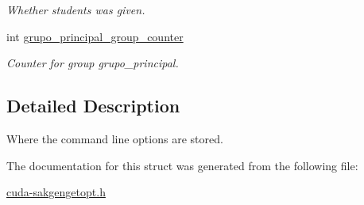 \begin{DoxyCompactItemize}
\begin{DoxyCompactList}\small\item\em Whether students was given. \end{DoxyCompactList}\item 
\hypertarget{structgengetopt__args__info_adea031a32e5ef772eaf83db95c152d3c}{int \hyperlink{structgengetopt__args__info_adea031a32e5ef772eaf83db95c152d3c}{grupo\-\_\-principal\-\_\-group\-\_\-counter}}\label{structgengetopt__args__info_adea031a32e5ef772eaf83db95c152d3c}

\begin{DoxyCompactList}\small\item\em Counter for group grupo\-\_\-principal. \end{DoxyCompactList}\end{DoxyCompactItemize}


\subsection{Detailed Description}
Where the command line options are stored. 

The documentation for this struct was generated from the following file\-:\begin{DoxyCompactItemize}
\item 
\hyperlink{cuda-sakgengetopt_8h}{cuda-\/sakgengetopt.\-h}\end{DoxyCompactItemize}
